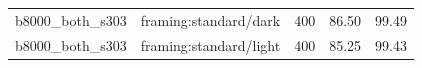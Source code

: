 \begin{longtable}{l>{\raggedright\arraybackslash}p{.42\linewidth}rrr}
b8000\_\allowbreak{}both\_\allowbreak{}s303 & %
framing:standard/dark & %
400 & %
86.50 & %
99.49 \\ %

b8000\_\allowbreak{}both\_\allowbreak{}s303 & %
framing:standard/light & %
400 & %
85.25 & %
99.43 \\ %


\end{longtable}
